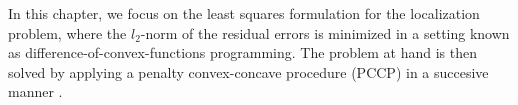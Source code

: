 
 
In this chapter, we focus on the least squares formulation for the localization problem, where the $l_2$-norm of the residual errors is minimized in a setting known as difference-of-convex-functions programming. The problem at hand is then solved by applying a penalty convex-concave procedure (PCCP) in a succesive manner \cite{PCCP}.


